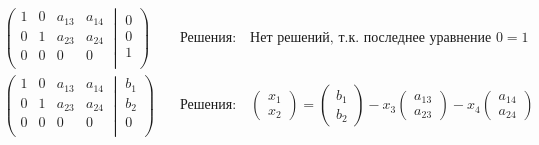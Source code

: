\documentclass{article}
\begin{document}
\begin{align*}
	\left(\left.
	\begin{matrix}
		1& 0&a_{13}& a_{14}\\
		0&1&a_{23}& a_{24}\\
		0& 0&0& 0\\
	\end{matrix}
	\:\right|\:
	\begin{matrix}
		0\\
		0\\
		1\\
	\end{matrix}
	\right)&\quad
	\text{Решения:}\quad
	\text{Нет решений, т.к. последнее уравнение }0 = 1
	\\
	\left(\left.
	\begin{matrix}
		1&0&a_{13}& a_{14}\\
		0& 1&a_{23}& a_{24}\\
		0& 0&0& 0\\
	\end{matrix}
	\:\right|\:
	\begin{matrix}
		b_1\\
		b_2\\
		0\\
	\end{matrix}
	\right)&\quad
	\text{Решения:}\quad
	\begin{pmatrix}
		x_1\\
		x_2
	\end{pmatrix}
	=
	\begin{pmatrix}
		b_1\\
		b_2
	\end{pmatrix}
	-
	x_3
	\begin{pmatrix}
		a_{13}\\
		a_{23}
	\end{pmatrix}
	-
	x_4
	\begin{pmatrix}
		a_{14}\\
		a_{24}
	\end{pmatrix}
\end{align*}
\newpage
\end{document}
